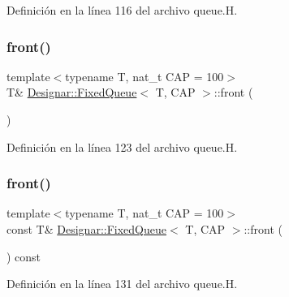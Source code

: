 Definición en la línea 116 del archivo queue.\+H.

\mbox{\label{class_designar_1_1_fixed_queue_a2440b268443093f6ff306e956d7f0616}} 
\subsubsection{\texorpdfstring{front()}{front()}\hspace{0.1cm}{\footnotesize\ttfamily [1/2]}}
{\footnotesize\ttfamily template$<$typename T, nat\+\_\+t C\+AP = 100$>$ \\
T\& \hyperlink{class_designar_1_1_fixed_queue}{Designar\+::\+Fixed\+Queue}$<$ T, C\+AP $>$\+::front (\begin{DoxyParamCaption}{ }\end{DoxyParamCaption})\hspace{0.3cm}{\ttfamily [inline]}}



Definición en la línea 123 del archivo queue.\+H.

\mbox{\label{class_designar_1_1_fixed_queue_ab86601d018b664a2f0d522bca18ee107}} 
\subsubsection{\texorpdfstring{front()}{front()}\hspace{0.1cm}{\footnotesize\ttfamily [2/2]}}
{\footnotesize\ttfamily template$<$typename T, nat\+\_\+t C\+AP = 100$>$ \\
const T\& \hyperlink{class_designar_1_1_fixed_queue}{Designar\+::\+Fixed\+Queue}$<$ T, C\+AP $>$\+::front (\begin{DoxyParamCaption}{ }\end{DoxyParamCaption}) const\hspace{0.3cm}{\ttfamily [inline]}}



Definición en la línea 131 del archivo queue.\+H.

\mbox{\label{class_designar_1_1_fixed_queue_aefa2e40721df2aff9ba56a2ef1f9db62}} 
